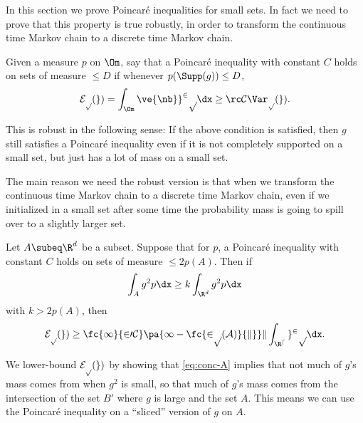 In this section we prove Poincar\'e inequalities for small sets. In fact we need to prove that this property is true robustly, in order to transform the continuous time Markov chain to a discrete time Markov chain.

\begin{df}
Given a measure $p$ on $\Om$, say that a Poincar\'e inequality with constant $C$ 
holds on sets of measure $\le D$ if whenever $p(\Supp(g))\le D$, 
$$
\cal E_p(g) = \int_{\Om} \ve{\nb g}^2p\dx\ge \rc C \Var_p(g).
$$
\end{df}

This is robust in the following sense: If the above condition is satisfied, then $g$ still satisfies a Poincar\'e inequality even if it is not completely supported on a small set, but just has a lot of mass on a small set.

The main reason we need the robust version is that when we transform the continuous time Markov chain to a discrete time Markov chain, even if we initialized in a small set after some time the probability mass is going to spill over to a slightly larger set.

\begin{lem}\label{lem:poincare-small}
Let $A\subeq \R^d$ be a subset. 
Suppose that for $p$, a Poincar\'e inequality with constant $C$ holds on sets of measure $\le 2p(A)$. Then if 
\begin{align}\label{eq:conc-A}
\int_A g^2 p\dx \ge k\int_{\R^d} g^2p\dx
\end{align}
with $k>2p(A)$, then
$$
\cal E_p(g) \ge \fc{1}{20C}\pa{1-\fc{2p(A)}{k}}k\int_{\R^d} g^2p\dx.
$$
\end{lem}
We lower-bound $\cal E_p(g)$ by showing that \eqref{eq:conc-A} implies that not much of $g$'s mass comes from when $g^2$ is small, so that much of $g$'s mass comes from the intersection of the set $B'$ where $g$ is large and the set $A$. This means we can use the Poincar\'e inequality on a ``sliced'' version of $g$ on $A$.

